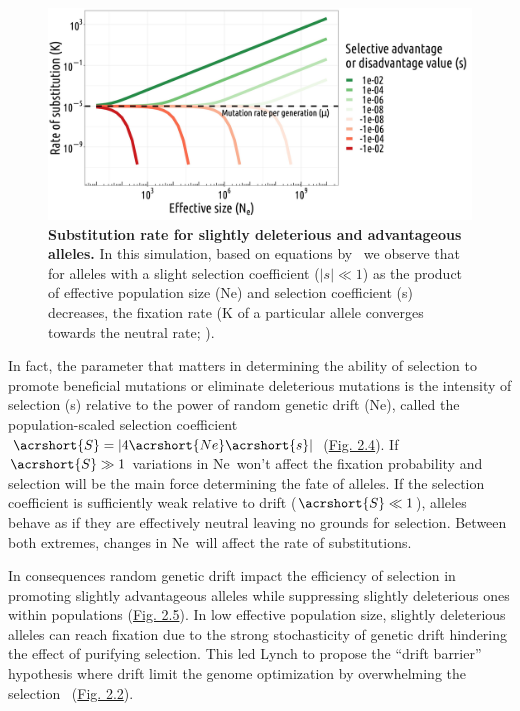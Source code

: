 \begin{figure}[H]
    \centering
    \includegraphics[width=\linewidth]{figures/Mutation rate.png}
    \caption[Substitution rate for slightly deleterious and advantageous alleles]{\textbf{Substitution rate for slightly deleterious and advantageous alleles.} In this simulation, based on equations by~\citet{lynch_origins_2007} we observe that for alleles with a slight selection coefficient ($|s| \ll 1$) as the product of \gls{effective population size} (\acrshort{Ne}) and selection coefficient (\acrshort{s}) decreases, the fixation rate (\acrshort{K} of a particular allele converges towards the neutral rate; \citet{lynch_origins_2007}).}
    \label{fig:Mutationrate}
\end{figure}

In fact, the parameter that matters in determining the ability of selection to promote beneficial mutations or eliminate deleterious mutations is the intensity of selection (\acrshort{s}) relative to the power of random genetic drift (\acrshort{Ne}), called the population-scaled selection coefficient $\acrshort{S} = |4\acrshort{Ne}\acrshort{s}|$ (\hyperref[fig:popscaled]{Fig. 2.4}). If $\acrshort{S} \gg 1$ variations in \acrshort{Ne}~won't affect the fixation probability and selection will be the main force determining the fate of alleles. If the selection coefficient is sufficiently weak relative to drift ($\acrshort{S} \ll 1 $), alleles behave as if they are effectively neutral leaving no grounds for selection. Between both extremes, changes in \acrshort{Ne}~will affect the rate of \gls{substitution}s.

In consequences random genetic drift impact the efficiency of selection in promoting slightly advantageous alleles while suppressing slightly deleterious ones within populations (\hyperref[fig:geneticdrift]{Fig. 2.5}). In low \gls{effective population size}, slightly deleterious alleles can reach fixation due to the strong stochasticity of genetic drift hindering the effect of purifying selection. This led Lynch to propose the “drift barrier” hypothesis where drift limit the genome optimization by overwhelming the selection~\citep{lynch_frailty_2007, lynch_evolution_2010} (\hyperref[fig:drift_selection]{Fig. 2.2}).

